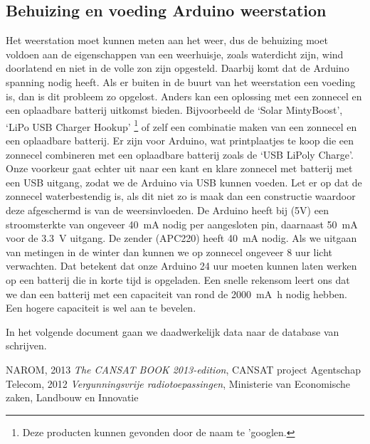 \subsection{Behuizing en voeding Arduino weerstation} 
Het weerstation moet kunnen
meten aan het weer, dus de behuizing moet voldoen aan de eigenschappen
van een weerhuisje, zoals waterdicht zijn, wind doorlatend en niet in de
volle zon zijn opgesteld. Daarbij komt dat de Arduino spanning nodig heeft. Als
er buiten in de buurt van het weerstation een voeding is, dan is dit
probleem zo opgelost. Anders kan een oplossing met een zonnecel
en een oplaadbare batterij uitkomst bieden. Bijvoorbeeld de `Solar
MintyBoost', `LiPo USB Charger Hookup' \footnote{Deze producten kunnen
gevonden door de naam te 'googlen.} of zelf een combinatie maken van een
zonnecel en een oplaadbare batterij. Er zijn voor Arduino, wat
printplaatjes te koop die een zonnecel combineren met een oplaadbare
batterij zoals de `USB LiPoly Charge'. Onze voorkeur gaat echter uit
naar een kant en klare zonnecel met batterij met een USB uitgang, zodat we de Arduino
via USB kunnen voeden. Let er op dat de zonnecel waterbestendig is, als dit niet zo is maak dan een
constructie waardoor deze afgeschermd is van de weersinvloeden.
De Arduino heeft bij (5V) een stroomsterkte van ongeveer \SI{40}{\milli\ampere} nodig per 
aangesloten pin, daarnaast \SI{50}{\milli\ampere} voor de \SI{3,3}{\volt} uitgang.
De zender (APC220) heeft \SI{40}{\milli\ampere} nodig.
Als we uitgaan van metingen in de winter dan kunnen we op zonnecel ongeveer
8 uur licht verwachten. Dat betekent dat onze Arduino 24 uur moeten kunnen laten werken
op een batterij die in korte tijd is opgeladen.
Een snelle rekensom leert ons dat we dan een batterij met een capaciteit van rond
de \SI{2000}{\milli\ampere\hour} nodig hebben. Een hogere capaciteit is wel aan te bevelen.

In het volgende document gaan we daadwerkelijk data naar de database van \hisparc schrijven. 

\begin{thebibliography}{9}
        NAROM, 2013 \emph{The CANSAT BOOK 2013-edition}, 
        CANSAT project
    Agentschap Telecom, 2012 \emph{Vergunningsvrije radiotoepassingen}, 
    Ministerie van Economische zaken, Landbouw en Innovatie
\end{thebibliography}



